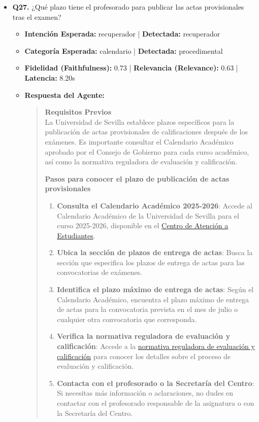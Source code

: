 \documentclass[12pt,a4paper,oneside]{report}
\begin{document}
\begin{itemize}
  
\item \textbf{Q27.} ¿Qué plazo tiene el profesorado para publicar las actas provisionales tras el examen? \\
        \begin{itemize}
          \item \textbf{Intención Esperada:} recuperador | \textbf{Detectada:} recuperador
          \item \textbf{Categoría Esperada:} calendario | \textbf{Detectada:} procedimental
          \item \textbf{Fidelidad (Faithfulness):} 0.73 | \textbf{Relevancia (Relevance):} 0.63 | \textbf{Latencia:} 8.20s
          \item \textbf{{Respuesta del Agente:}} \\
                \begin{quote}

\noindent\textbf{Requisitos Previos}\\

La Universidad de Sevilla establece plazos específicos para la publicación de actas provisionales de calificaciones después de los exámenes. Es importante consultar el Calendario Académico aprobado por el Consejo de Gobierno para cada curso académico, así como la normativa reguladora de evaluación y calificación.


\noindent\textbf{Pasos para conocer el plazo de publicación de actas provisionales}\\

\begin{enumerate}
  \item \textbf{Consulta el Calendario Académico 2025-2026}: Accede al Calendario Académico de la Universidad de Sevilla para el curso 2025-2026, disponible en el \href{https://cat.us.es/sites/default/files/2025-03/calendario-academico-2025-2026-cg.pdf}{Centro de Atención a Estudiantes}.
  \item \textbf{Ubica la sección de plazos de entrega de actas}: Busca la sección que especifica los plazos de entrega de actas para las convocatorias de exámenes.
  \item \textbf{Identifica el plazo máximo de entrega de actas}: Según el Calendario Académico, encuentra el plazo máximo de entrega de actas para la convocatoria prevista en el mes de julio o cualquier otra convocatoria que corresponda.
  \item \textbf{Verifica la normativa reguladora de evaluación y calificación}: Accede a la \href{https://cat.us.es/sites/default/files/documentos/2025-07/normativa-reguladora-de-evaluacion-y-calificacion.pdf}{normativa reguladora de evaluación y calificación} para conocer los detalles sobre el proceso de evaluación y calificación.
  \item \textbf{Contacta con el profesorado o la Secretaría del Centro}: Si necesitas más información o aclaraciones, no dudes en contactar con el profesorado responsable de la asignatura o con la Secretaría del Centro.
\end{enumerate}



\end{quote}
\end{itemize}
\end{itemize}
\end{document}

